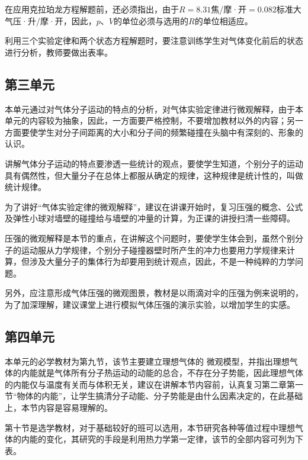 在应用克拉珀龙方程解题前，还必须指出，由于$R=8.31$焦/摩·开$=0.082$标准大气压·升/摩·开，因此，$p$、$V$的单位必须与选用的$R$的单位相适应。

利用三个实验定律和两个状态方程解题时，要注意训练学生对气体变化前后的状态进行分析，教师要做出表率。

\subsection{第三单元}
本单元通过对气体分子运动的特点的分析，对气体实验定律进行微观解释，由于本单元的内容较为抽象，因此，一方面要严格控制，不要增加教材以外的内容；另一方面要使学生对分子间距离的大小和分子间的频繁碰撞在头脑中有深刻的、形象的认识。

讲解气体分子运动的特点要渗透一些统计的观点，要使学生知道，个别分子的运动具有偶然性，但大量分子在总体上都服从确定的规律，这种规律是统计性的，叫做统计规律。

为了讲好“气体实验定律的微观解释”，建议在讲课开始时，复习压强的概念、公式及弹性小球对墙壁的碰撞给与墙壁的冲量的计算，为正课的讲授扫清一些障碍。

压强的微观解释是本节的重点，在讲解这个问题时，要使学生体会到，虽然个别分子的运动服从力学规律，个别分子碰撞器壁时所产生的冲力也要用力学规律来计算，但涉及大量分子的集体行为却要用到统计观点，因此，不是一种纯粹的力学问题。

另外，应注意形成气体压强的微观图景，教材是以雨滴对伞的压强为例来说明的，为了加深理解，建议课堂上进行模拟气体压强的演示实验，以增加学生的实感。

\subsection{第四单元}
本单元的必学教材为第九节，该节主要建立理想气体的
微观模型，并指出理想气体的内能就是气体所有分子热运动的动能的总合，不存在分子势能，因此理想气体的内能仅与温度有关而与体积无关，建议在讲解本节内容前，认真复习第二章第一节“物体的内能”，让学生搞清分子动能、分子势能是由什么因素决定的，在此基础上，本节内容是容易理解的。

第十节是选学教材，对于基础较好的班可以选用，本节研究各种等值过程中理想气体的内能的变化，其研究的手段是利用热力学第一定律，该节的全部内容可列为下表。

